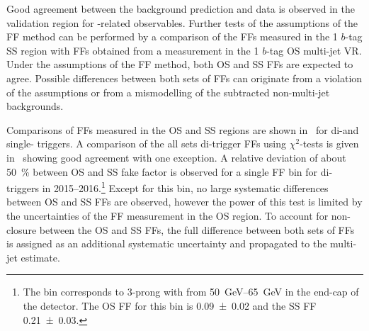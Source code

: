 Good agreement between the background prediction and data is observed in the
validation region for \tauhadvis-related observables. Further tests of the
assumptions of the FF method can be performed by a comparison of the FFs
measured in the 1 $b$-tag SS region with FFs obtained from a measurement in the
1 $b$-tag OS multi-jet VR. Under the assumptions of the FF method, both OS and
SS FFs are expected to agree. Possible differences between both sets of FFs can
originate from a violation of the assumptions or from a mismodelling of the
subtracted non-multi-jet backgrounds.

Comparisons of FFs measured in the OS and SS regions are shown
in~ for di-\tauhadvis and single-\tauhadvis
triggers. A comparison of the all sets di-\tauhadvis trigger FFs using
$\chi^2$-tests is given in~ showing good
agreement with one exception. %
A relative deviation of about \SI{50}{\percent} between OS and SS fake factor is
observed for a single FF bin for di-\tauhadvis triggers in
2015--2016.\footnote{The bin corresponds to 3-prong \tauhadvis with \pT from
  \SIrange{50}{65}{\GeV} in the end-cap of the detector. The OS FF for this bin
  is \num{0.09 +- 0.02} and the SS FF \num{0.21 +- 0.03}.}  Except for this bin,
no large systematic differences between OS and SS FFs are observed, however the
power of this test is limited by the uncertainties of the FF measurement in the
OS region. To account for non-closure between the OS and SS FFs, the full
difference between both sets of FFs is assigned as an additional systematic
uncertainty and propagated to the multi-jet estimate.


